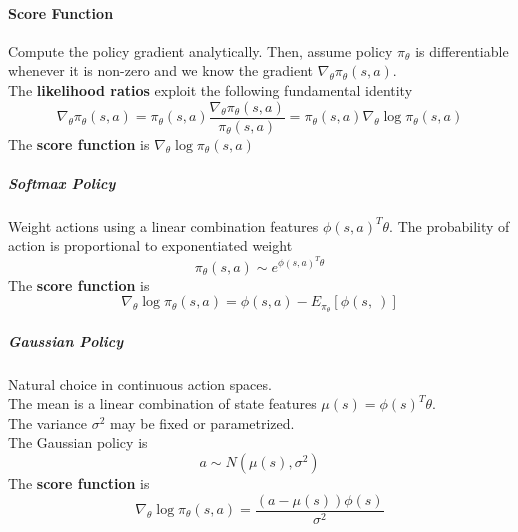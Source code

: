 \documentclass[10pt]{report}
\begin{document}
\paragraph{Score Function} Compute the policy gradient analytically. Then, assume policy $\pi_\theta$ is differentiable whenever it is non-zero and we know the gradient $\nabla_\theta\pi_\theta(s,a)$.\\
The \textbf{likelihood ratios} exploit the following fundamental identity
$$\nabla_\theta\pi_\theta(s,a)=\pi_\theta(s,a)\frac{\nabla_\theta\pi_\theta(s,a)}{\pi_\theta(s,a)} = \pi_\theta(s,a)\nabla_\theta\log\pi_\theta(s,a)$$
The \textbf{score function} is $\nabla_\theta\log\pi_\theta(s,a)$
\subparagraph{Softmax Policy} Weight actions using a linear combination features $\phi(s,a)^T\theta$. The probability of action is proportional to exponentiated weight $$\pi_\theta(s,a)\sim e^{\phi(s,a)^T\theta}$$
The \textbf{score function} is $$\nabla_\theta\log\pi_\theta(s,a)=\phi(s,a)-E_{\pi_\theta}[\phi(s,\:)]$$
\subparagraph{Gaussian Policy} Natural choice in continuous action spaces.\\
The mean is a linear combination of state features $\mu(s) = \phi(s)^T\theta$.\\
The variance $\sigma^2$ may be fixed or parametrized.\\
The Gaussian policy is $$a\sim N(\mu(s),\sigma^2)$$
The \textbf{score function} is $$\nabla_\theta\log\pi_\theta(s,a)=\frac{(a-\mu(s))\phi(s)}{\sigma^2}$$
\end{document}

